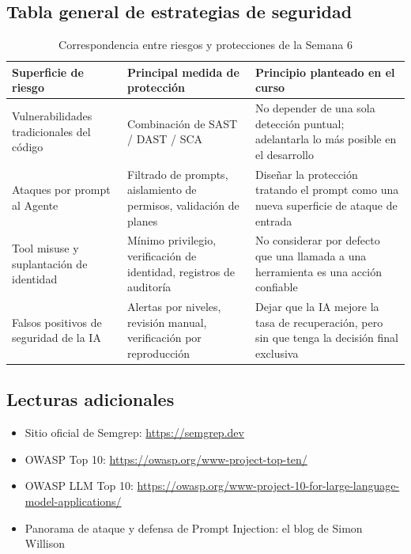 \documentclass[a4paper]{article}
\begin{document}
\subsection{Tabla general de estrategias de seguridad}

\begin{table}[H]
\centering
\begin{tabular}{p{} p{} p{}}
\toprule
Superficie de riesgo & Principal medida de protección & Principio planteado en el curso \\
\midrule
Vulnerabilidades tradicionales del código & Combinación de SAST / DAST / SCA & No depender de una sola detección puntual; adelantarla lo más posible en el desarrollo \\
Ataques por prompt al Agente & Filtrado de prompts, aislamiento de permisos, validación de planes & Diseñar la protección tratando el prompt como una nueva superficie de ataque de entrada \\
Tool misuse y suplantación de identidad & Mínimo privilegio, verificación de identidad, registros de auditoría & No considerar por defecto que una llamada a una herramienta es una acción confiable \\
Falsos positivos de seguridad de la IA & Alertas por niveles, revisión manual, verificación por reproducción & Dejar que la IA mejore la tasa de recuperación, pero sin que tenga la decisión final exclusiva \\
\bottomrule
\end{tabular}
\caption{Correspondencia entre riesgos y protecciones de la Semana 6}
\end{table}

\subsection{Lecturas adicionales}

\begin{itemize}
    \item Sitio oficial de Semgrep: \url{https://semgrep.dev}
    \item OWASP Top 10: \url{https://owasp.org/www-project-top-ten/}
    \item OWASP LLM Top 10: \url{https://owasp.org/www-project-10-for-large-language-model-applications/}
    \item Panorama de ataque y defensa de Prompt Injection: el blog de Simon Willison
\end{itemize}

\end{document}
